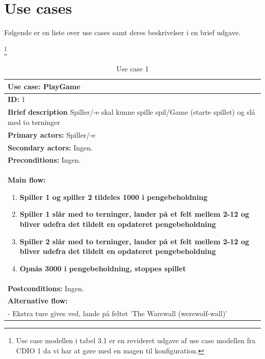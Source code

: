 \section{Use cases}

Følgende er en liste over use cases samt deres beskrivelser i en brief udgave.

\footnote{Use case modellen i tabel 3.1 er en revideret udgave af use case modellen fra CDIO 1 da vi har at gøre med en magen til konfiguration.}

\begin{table}[H]
    \begin{center}
        \begin{tabular}{ | p{15cm} |}
            \hline
            \textbf{Use case:} PlayGame \\ \hline
            \textbf{ID:} 1 \\ \hline
            \textbf{Brief description} Spiller/-e skal kunne spille spil/Game (starte spillet) og slå med to terninger     \\ \hline
            \textbf{Primary actors:} Spiller/-e \\ \hline
            \textbf{Secondary actors:} Ingen. \\ \hline
            \textbf{Preconditions:} Ingen.     \\ \hline
            \textbf{Main flow:}
            \begin{enumerate}
                \item \textbf{Spiller 1 og spiller 2 tildeles 1000 i pengebeholdning}
                \item \textbf{Spiller 1 slår med to terninger, lander på et felt mellem 2-12 og bliver udefra det tildelt en opdateret pengebeholdning}
                \item \textbf{Spiller 2 slår med to terninger, lander på et felt mellem 2-12 og bliver udefra det tildelt en opdateret pengebeholdning}
                \item \textbf{Opnås 3000 i pengebeholdning, stoppes spillet} 
            \end{enumerate} \\ \hline
            \textbf{Postconditions:} Ingen.\\ \hline
            \textbf{Alternative flow:}
            \\- Ekstra ture gives ved, lande på feltet 'The Warewall (werewolf-wall)' \\ \hline
            \hline
        \end{tabular}
        \caption{Use case 1}
        \label{usecase:1}
    \end{center}
\end{table}

